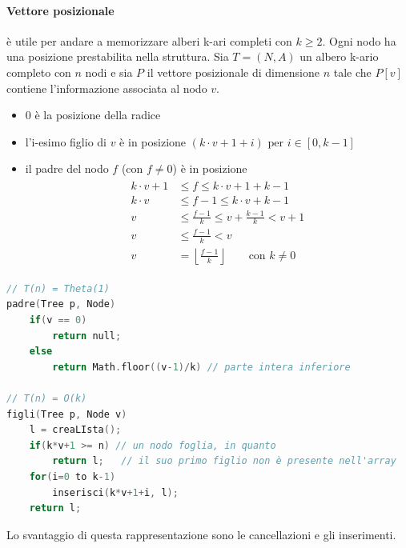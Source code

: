 \documentclass[italian]{article}
\begin{document}
\paragraph{Vettore posizionale} è utile per andare a memorizzare alberi k-ari completi con $k \geq 2$. Ogni nodo ha una posizione prestabilita nella struttura. Sia $T = (N,A)$ un albero k-ario completo con $n$ nodi e sia $P$ il vettore posizionale di dimensione $n$ tale che $P[v]$ contiene l'informazione associata al nodo $v$. 
\begin{itemize}[itemsep=0pt]
	\item $0$ è la posizione della radice
	\item l'i-esimo figlio di $v$ è in posizione $(k\cdot v + 1 +i) \text{ per } i \in [0,k-1]$
	\item il padre del nodo $f$ (con $f \neq 0$) è in posizione 
	\begin{gather*}
		\begin{align*}
			k\cdot v+1 &\leq f \leq k\cdot v+1+k-1 \\
			k\cdot v &\leq f-1 \leq k\cdot v+k-1 \\
			v &\leq \frac{f-1}{k} \leq v + \frac{k-1}{k} < v+1 \\
			v &\leq \frac{f-1}{k} < v \\
			v &= \left\lfloor \frac{f-1}{k} \right\rfloor \qquad \text{con $k \neq 0$} 
		\end{align*}
	\end{gather*}
\end{itemize}
\begin{lstlisting}[language=c,mathescape=true]
// T(n) = Theta(1)
padre(Tree p, Node)
	if(v == 0)
		return null;
	else
		return Math.floor((v-1)/k) // parte intera inferiore

// T(n) = O(k)
figli(Tree p, Node v)
	l = creaLIsta();
	if(k*v+1 >= n) // un nodo foglia, in quanto 
		return l;	// il suo primo figlio non è presente nell'array
	for(i=0 to k-1)
		inserisci(k*v+1+i, l);
	return l;
\end{lstlisting}
Lo svantaggio di questa rappresentazione sono le cancellazioni e gli inserimenti.
\pagebreak
\end{document}

